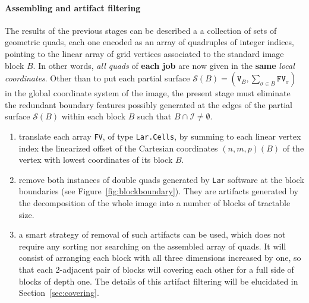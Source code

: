 \paragraph{Assembling and artifact filtering} 
The results of the previous stages can be described a a collection of sets of geometric quads, each one encoded as an array of quadruples of integer indices, pointing to the linear array of grid vertices associated to the standard image block $B$.  In other words, \emph{all quads} of \textbf{each job} are now given in the \textbf{same} \emph{local coordinates}.  Other than to put each partial surface $\mathcal{S}(B) = (\texttt{V}_B, \sum_{\sigma\in B} \texttt{FV}_\sigma)$ in the global coordinate system of the image, the present stage must eliminate the redundant boundary features possibly generated at the edges of the partial surface $\mathcal{S}(B)$ within each block $B$ such that $B \cap \mathcal{I} \not= \emptyset$.
\begin{enumerate}

\item translate each array \texttt{FV}, of type \texttt{Lar.Cells}, by summing to each linear vertex index the linearized offset of the Cartesian coordinates $(n,m,p)(B)$ of the vertex with lowest coordinates of its block $B$.

\item remove both instances of double quads generated by \texttt{Lar} software at the block boundaries (see Figure~\ref{fig:blockboundary}). They are artifacts generated by the decomposition of the whole image into a number of blocks of tractable size.

\item 
a smart strategy of removal of such artifacts can be used, which does not require any sorting nor searching on the assembled array of quads. It will consist of arranging each block with all three dimensions increased by one, so that each 2-adjacent pair of blocks will covering each other for a full side of blocks of depth one. The details of this artifact filtering will be elucidated in Section~\ref{sec:covering}.

\end{enumerate}


